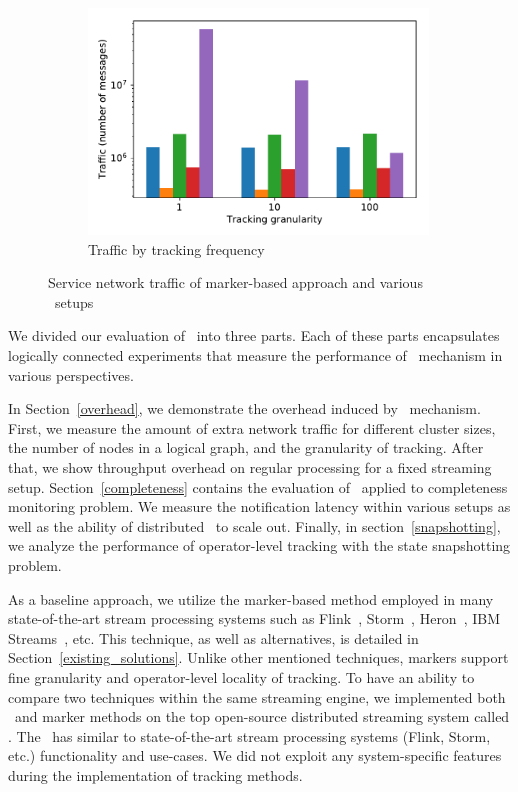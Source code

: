 \begin{figure}[t!]
\begin{subfigure}[b]{0.32\textwidth}
            \includegraphics[width=0.99\textwidth]{pics/traffic_by_tracking_frequency_bars.pdf}
            \caption{Traffic by tracking frequency}
            \label{traffic_granularity}
	\end{subfigure}
    \caption{Service network traffic of marker-based approach and various \tracker\ setups}
    \label{traffic_plots}
\end{figure}

\label {fs-acker-experiments}

We divided our evaluation of \tracker\ into three parts. Each of these parts encapsulates logically connected experiments that measure the performance of \tracker\ mechanism in various perspectives.

In Section~\ref{overhead}, we demonstrate the overhead induced by \tracker\ mechanism. First, we measure the amount of extra network traffic for different cluster sizes, the number of nodes in a logical graph, and the granularity of tracking. After that, we show throughput overhead on regular processing for a fixed streaming setup. Section~\ref{completeness} contains the evaluation of \tracker\ applied to completeness monitoring problem. We measure the notification latency within various setups as well as the ability of distributed \tracker\ to scale out. Finally, in section~\ref{snapshotting}, we analyze the performance of operator-level tracking with the state snapshotting problem. 

As a baseline approach, we utilize the marker-based method employed in many state-of-the-art stream processing systems such as Flink~\cite{Carbone:2017:SMA:3137765.3137777}, Storm~\cite{apache:storm:state}, Heron~\cite{Kulkarni:2015:THS:2723372.2742788}, IBM Streams~\cite{jacques2016consistent}, etc. This technique, as well as alternatives, is detailed in Section~\ref{existing_solutions}. Unlike other mentioned techniques, markers support fine granularity and operator-level locality of tracking. To have an ability to compare two techniques within the same streaming engine, we implemented both \tracker\ and marker methods on the top open-source distributed streaming system called \FlameStream. The  \FlameStream\ has similar to state-of-the-art stream processing systems (Flink, Storm, etc.) functionality and use-cases. We did not exploit any system-specific features during the implementation of tracking methods.

